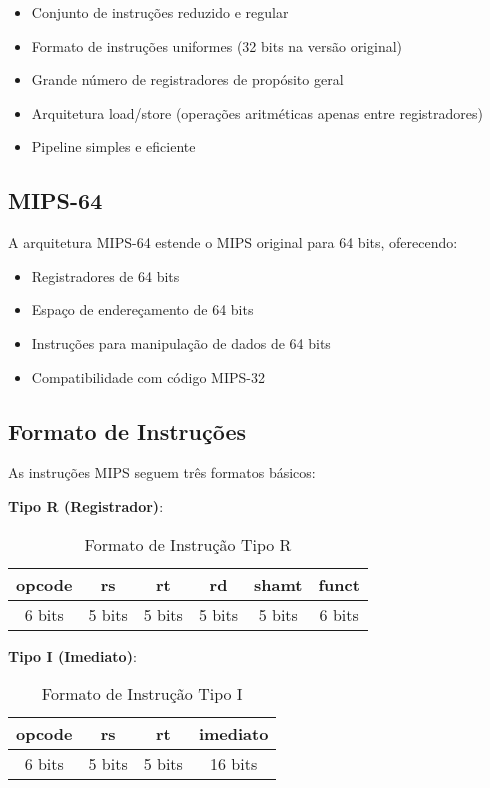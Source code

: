 \documentclass[
	12pt,				%
	oneside,
	a4paper,			%
	english,			%
	french,				%
	spanish,			%
	brazil,				%
	]{abntex2}
\begin{document}
\begin{itemize}
    \item Conjunto de instruções reduzido e regular
    \item Formato de instruções uniformes (32 bits na versão original)
    \item Grande número de registradores de propósito geral
    \item Arquitetura load/store (operações aritméticas apenas entre registradores)
    \item Pipeline simples e eficiente
\end{itemize}

\subsection{MIPS-64}
A arquitetura MIPS-64 estende o MIPS original para 64 bits, oferecendo:
\begin{itemize}
    \item Registradores de 64 bits
    \item Espaço de endereçamento de 64 bits
    \item Instruções para manipulação de dados de 64 bits
    \item Compatibilidade com código MIPS-32
\end{itemize}

\subsection{Formato de Instruções}
As instruções MIPS seguem três formatos básicos:

\textbf{Tipo R (Registrador)}:
\begin{table}[H]
\centering
\caption{Formato de Instrução Tipo R}
\begin{tabular}{|c|c|c|c|c|c|}
\hline
opcode & rs & rt & rd & shamt & funct \\
\hline
6 bits & 5 bits & 5 bits & 5 bits & 5 bits & 6 bits \\
\hline
\end{tabular}
\end{table}

\textbf{Tipo I (Imediato)}:
\begin{table}[H]
\centering
\caption{Formato de Instrução Tipo I}
\begin{tabular}{|c|c|c|c|}
\hline
opcode & rs & rt & imediato \\
\hline
6 bits & 5 bits & 5 bits & 16 bits \\
\hline
\end{tabular}
\end{table}
\end{document}
